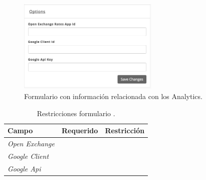 \begin{figure}[H]
	\centering
	\includegraphics[width=0.6\textwidth]{figuras/dashboard/ecommerce/options/menu.png}
	\caption{Formulario con información relacionada con los Analytics.}
	\label{figure:dashboard:ecommerce:options:menu}
\end{figure}

\begin{table}[H]
    \centering
	\begin{tabular}{ |l|c||l| }
		\hline Campo & Requerido & Restricción \\ \hline
		\multirow{1}{*}{\textit{Open Exchange}} 	&  {\checkmark} &  \\ \hline
		\multirow{1}{*}{\textit{Google Client}} 	&  {\checkmark} &  \\ \hline
		\multirow{1}{*}{\textit{Google Api}} 		&  {\checkmark} &  \\ \hline
		\hline
	\end{tabular}
 	\caption{Restricciones formulario \optionsPanel.}
    \label{tab:dashboard:ecommerce:form:options}
\end{table}